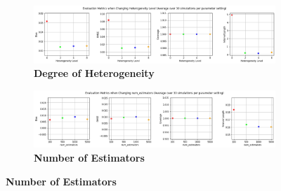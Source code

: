 \documentclass[12pt]{article}
\begin{document}
\begin{figure}
\ContinuedFloat
	\begin{subfigure} [t] {\linewidth}
		\caption{\textbf{Degree of Heterogeneity}}
   	 	\includegraphics[width = \linewidth]{Graphs/s2_hetero.png}
	\end{subfigure}
	\begin{subfigure} [t] {\linewidth}
\vspace{0.5cm}
		\caption{\textbf{Number of Estimators}}
   	 	\includegraphics[width = \linewidth]{Graphs/s2_nestimator.png}
	\end{subfigure}
\end{figure} 
\end{document}
